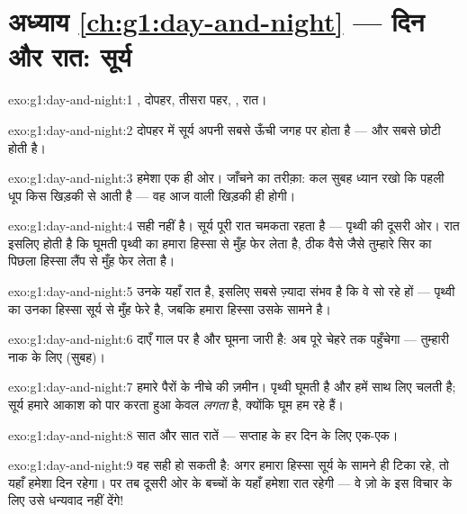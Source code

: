 \section*{अध्याय \ref{ch:g1:day-and-night} --- दिन और रात: सूर्य}

\begin{solution}{exo:g1:day-and-night:1}
, दोपहर, तीसरा पहर, , रात।
\end{solution}

\begin{solution}{exo:g1:day-and-night:2}
दोपहर में सूर्य अपनी सबसे ऊँची जगह पर होता है --- और  सबसे छोटी
होती है।
\end{solution}

\begin{solution}{exo:g1:day-and-night:3}
हमेशा एक ही ओर। जाँचने का तरीक़ा: कल सुबह ध्यान रखो कि पहली धूप किस
खिड़की से आती है --- वह आज वाली खिड़की ही होगी।
\end{solution}

\begin{solution}{exo:g1:day-and-night:4}
सही नहीं है। सूर्य पूरी रात चमकता रहता है --- पृथ्वी की दूसरी ओर।
रात इसलिए होती है कि घूमती पृथ्वी का हमारा हिस्सा  से मुँह फेर
लेता है, ठीक वैसे जैसे तुम्हारे सिर का पिछला हिस्सा लैंप से मुँह फेर
लेता है।
\end{solution}

\begin{solution}{exo:g1:day-and-night:5}
उनके यहाँ रात है, इसलिए सबसे ज़्यादा संभव है कि वे सो रहे हों ---
पृथ्वी का उनका हिस्सा सूर्य से मुँह फेरे है, जबकि हमारा हिस्सा उसके
सामने है।
\end{solution}

\begin{solution}{exo:g1:day-and-night:6}
 दाएँ गाल पर है और घूमना जारी है: अब  पूरे चेहरे तक
पहुँचेगा --- तुम्हारी नाक के लिए  (सुबह)।
\end{solution}

\begin{solution}{exo:g1:day-and-night:7}
हमारे पैरों के नीचे की ज़मीन। पृथ्वी घूमती है और हमें साथ लिए चलती
है; सूर्य हमारे आकाश को पार करता हुआ केवल \emph{लगता} है, क्योंकि
घूम हम रहे हैं।
\end{solution}

\begin{solution}{exo:g1:day-and-night:8}
सात  और सात रातें --- सप्ताह के हर दिन के लिए एक-एक।
\end{solution}

\begin{solution}{exo:g1:day-and-night:9}
वह सही हो सकती है: अगर हमारा हिस्सा सूर्य के सामने ही टिका रहे, तो
यहाँ हमेशा दिन रहेगा। पर तब दूसरी ओर के बच्चों के यहाँ हमेशा रात
रहेगी --- वे ज़ो के इस विचार के लिए उसे धन्यवाद नहीं देंगे!
\end{solution}
